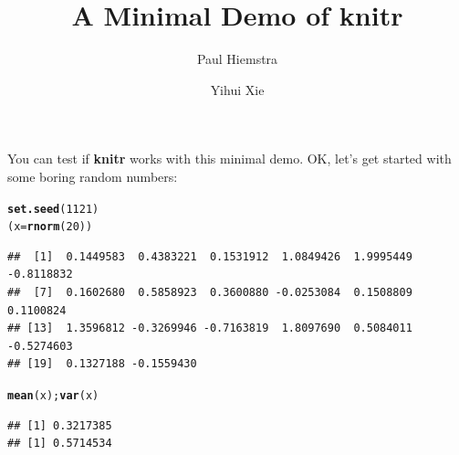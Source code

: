 \documentclass{beamer}\usepackage[]{graphicx}\usepackage[]{color}
\makeatletter
\newcommand{\hlnum}[1]{\textcolor[rgb]{0.686,0.059,0.569}{#1}}%
\newcommand{\hlstd}[1]{\textcolor[rgb]{0.345,0.345,0.345}{#1}}%
\newcommand{\hlkwb}[1]{\textcolor[rgb]{0.69,0.353,0.396}{#1}}%
\newcommand{\hlkwd}[1]{\textcolor[rgb]{0.737,0.353,0.396}{\textbf{#1}}}%
\newenvironment{kframe}{%
 \def\at@end@of@kframe{}%
 \ifinner\ifhmode%
  \def\at@end@of@kframe{\end{minipage}}%
  \begin{minipage}{\columnwidth}%
 \fi\fi%
 \def\FrameCommand##1{\hskip\@totalleftmargin \hskip-\fboxsep
 \colorbox{shadecolor}{##1}\hskip-\fboxsep
     \hskip-\linewidth \hskip-\@totalleftmargin \hskip\columnwidth}%
 \MakeFramed {\advance\hsize-\width
   \@totalleftmargin\z@ \linewidth\hsize
   \@setminipage}}%
 {\par\unskip\endMakeFramed%
 \at@end@of@kframe}
\newenvironment{knitrout}{}{} %
\makeatother
\begin{document}
\title{A Minimal Demo of knitr}
\author{Paul Hiemstra \and Yihui Xie}

\maketitle


\begin{frame}[fragile]
You can test if \textbf{knitr} works with this minimal demo. OK, let's
get started with some boring random numbers:

\begin{knitrout}\footnotesize
{}\color{fgcolor}\begin{kframe}
\begin{alltt}
\hlkwd{set.seed}\hlstd{(}\hlnum{1121}\hlstd{)}
\hlstd{(x}\hlkwb{=}\hlkwd{rnorm}\hlstd{(}\hlnum{20}\hlstd{))}
\end{alltt}
\begin{verbatim}
##  [1]  0.1449583  0.4383221  0.1531912  1.0849426  1.9995449 -0.8118832
##  [7]  0.1602680  0.5858923  0.3600880 -0.0253084  0.1508809  0.1100824
## [13]  1.3596812 -0.3269946 -0.7163819  1.8097690  0.5084011 -0.5274603
## [19]  0.1327188 -0.1559430
\end{verbatim}
\begin{alltt}
\hlkwd{mean}\hlstd{(x);}\hlkwd{var}\hlstd{(x)}
\end{alltt}
\begin{verbatim}
## [1] 0.3217385
## [1] 0.5714534
\end{verbatim}
\end{kframe}
\end{knitrout}
\end{frame}
\end{document}
